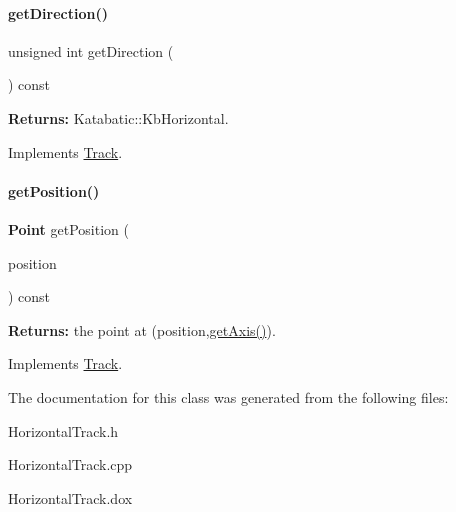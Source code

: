 \mbox{\label{classKite_1_1HorizontalTrack_a0dd7cf705ace42c662c289955313b2e9}} 
\paragraph{\texorpdfstring{get\+Direction()}{getDirection()}}
{\footnotesize\ttfamily unsigned int get\+Direction (\begin{DoxyParamCaption}{ }\end{DoxyParamCaption}) const\hspace{0.3cm}{\ttfamily [virtual]}}

{\bfseries Returns\+:} Katabatic\+::\+Kb\+Horizontal. 

Implements \mbox{\hyperlink{classKite_1_1Track_ae35b78590ed6aa546b626ef95f28c533}{Track}}.

\mbox{\label{classKite_1_1HorizontalTrack_a6ab4f8026e4500918aa8721f1199f8b6}} 
\paragraph{\texorpdfstring{get\+Position()}{getPosition()}}
{\footnotesize\ttfamily \textbf{ Point} get\+Position (\begin{DoxyParamCaption}\item[{\textbf{ Db\+U\+::\+Unit}}]{position }\end{DoxyParamCaption}) const\hspace{0.3cm}{\ttfamily [virtual]}}

{\bfseries Returns\+:} the point at {\ttfamily }(position,\mbox{\hyperlink{classKite_1_1Track_ab5b5aaa5b318369feee6003dbad039c2}{get\+Axis()}}). 

Implements \mbox{\hyperlink{classKite_1_1Track_a2a033f90e528d3d07aa33694dd733200}{Track}}.



The documentation for this class was generated from the following files\+:\begin{DoxyCompactItemize}
\item 
Horizontal\+Track.\+h\item 
Horizontal\+Track.\+cpp\item 
Horizontal\+Track.\+dox\end{DoxyCompactItemize}
